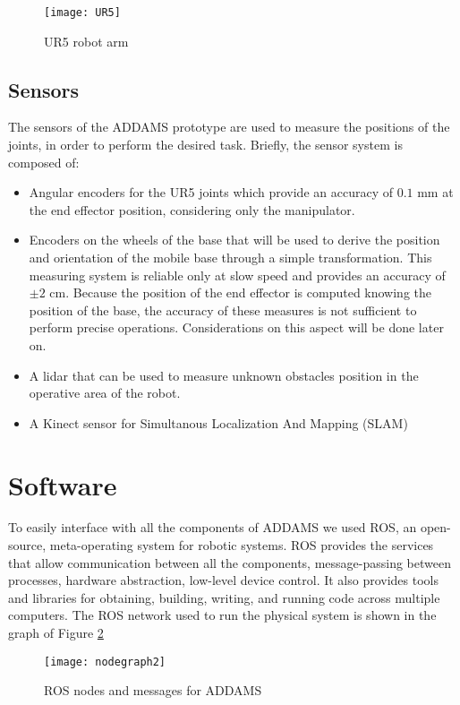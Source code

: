 \begin{figure}[htbp]
	\begin{center} 
		\texttt{[image: UR5]}
		\centering
		\label{fig:UR5}
		\caption{UR5 robot arm} 
	\end{center}
\end{figure}


\subsection{Sensors}

The sensors of the ADDAMS prototype are used to measure the positions of the joints, in order to perform the desired task. Briefly, the sensor system is composed of:
\begin{itemize}
	\item Angular encoders for the UR5 joints which provide an accuracy of $0.1$ mm at the end effector position, considering only the manipulator.
	\item Encoders on the wheels of the base that will be used to derive the position and orientation of the mobile base through a simple transformation. This measuring system is reliable only at slow speed and provides an accuracy of $\pm 2$ cm. Because the position of the end effector is computed knowing the position of the base, the accuracy of these measures is not sufficient to perform precise operations. Considerations on this aspect will be done later on.
	\item A lidar that can be used to measure unknown obstacles position in the operative area of the robot.
	\item A Kinect sensor for Simultanous Localization And Mapping (SLAM)
\end{itemize}

\section{Software}

To easily interface with all the components of ADDAMS we used ROS, an open-source, meta-operating system for robotic systems. ROS provides the services that allow communication between all the components, message-passing between processes, hardware abstraction, low-level device control. It also provides tools and libraries for obtaining, building, writing, and running code across multiple computers. The ROS network used to run the physical system is shown in the graph of Figure \ref{ROSnodes}
\begin{figure}[h!]

	\texttt{[image: nodegraph2]}
	\centering
	
	\caption{ROS nodes and messages for ADDAMS}
\label{ROSnodes} 
\end{figure}

